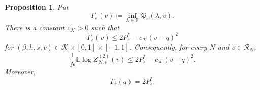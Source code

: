 \documentclass[11pt]{article}
\newtheorem{proposition}[theorem]{Proposition}
\numberwithin{equation}{section}
\newcommand{\E}{\mathbb{E}}
\newcommand{\1}{\mathbf 1}
\newcommand{\cK}{\mathcal K}
\begin{document}
\begin{proposition}
\label{prop:GTcoercivity}
Put
\[
 \Gamma_s(v)\coloneqq\inf_{\lambda\in\mathbb R}
 \mathfrak P_s(\lambda,v).
\]
There is a constant $c_{\cK}>0$ such that
\begin{equation}
 \Gamma_s(v)
 \le 2P_s^*-c_{\cK}(v-q)^2
 \label{eq:Gamma-coercivity}
\end{equation}
for $(\beta,h,s,v)\in\cK\times[0,1]\times[-1,1]$.  Consequently,
for every $N$ and $v\in\mathcal R_N$,
\begin{equation}
 \frac1N\E\log Z^{(2)}_{N,s}(v)
 \le 2P_s^*-c_{\cK}(v-q)^2.
 \label{eq:GTcoercivity}
\end{equation}
Moreover,
\begin{equation}
 \Gamma_s(q)=2P_s^*.
 \label{eq:Gamma-at-q}
\end{equation}
\end{proposition}
\end{document}
